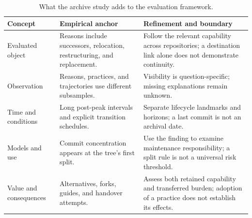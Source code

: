 \begin{table}[tbp]
\caption{What the archive study adds to the evaluation framework.}
\label{tab:ch8-feedback}
\centering\small\renewcommand{\arraystretch}{1.14}
\begin{tabularx}{\linewidth}{@{}>{\raggedright\arraybackslash}p{25mm}>{\raggedright\arraybackslash}X>{\raggedright\arraybackslash}X@{}}\toprule
Concept & Empirical anchor & Refinement and boundary\\\midrule
Evaluated object & Reasons include successors, relocation, restructuring, and replacement. & Follow the relevant capability across repositories; a destination link alone does not demonstrate continuity.\\
Observation & Reasons, practices, and trajectories use different subsamples. & Visibility is question-specific; missing explanations remain unknown.\\
Time and conditions & Long post-peak intervals and explicit transition schedules. & Separate lifecycle landmarks and horizons; a last commit is not an archival date.\\
Models and use & Commit concentration appears at the tree's first split. & Use the finding to examine maintenance responsibility; a split rule is not a universal risk threshold.\\
Value and consequences & Alternatives, forks, guides, and handover attempts. & Assess both retained capability and transferred burden; adoption of a practice does not establish its effects.\\\bottomrule
\end{tabularx}
\end{table}
